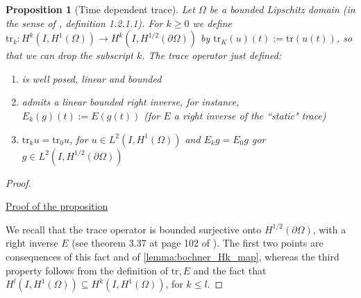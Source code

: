\documentclass[english,a4paper,9pt,oneside]{scrbook}	%
\theoremstyle{break}
\newtheorem{prop}[equation]{Proposition}
\newenvironment{mproof}[1][\proofname]{%
  \begin{proof}[#1]$ $\par\nobreak\ignorespaces
}{%
  \end{proof}
}
\renewcommand*{\proofname}{Proof}
\theoremstyle{remark}
\newcommand{\tr}{\text{tr}}
\newcommand{\emb}{\hookrightarrow}
\begin{document}
\begin{appendices}
\begin{prop}[Time dependent trace]
\label{prop:trace}
Let $\Omega$ be a bounded Lipschitz domain (in the sense of \cite{grisvard}, definition 1.2.1.1). For $k\geq 0$ we define $\tr_k: H^k(I,H^1(\Omega))\rightarrow H^k(I, H^{1/2} (\partial \Omega))$ by $\tr_K(u)(t):=\tr(u(t))$, so that we can drop the subscript $k$. The trace operator just defined:
\begin{enumerate}
\item is well posed, linear and bounded
\item admits a linear bounded right inverse, for instance, $E_k(g)(t):=E(g(t))$ (for $E$ a right inverse of the ``static" trace)
\item $\tr_k u = \tr_0 u$, for $u \in L^2(I,H^1(\Omega))$ and $E_k g = E_0g$ gor $g \in L^2(I,H^{1/2}(\partial \Omega))$
\end{enumerate}
\end{prop}
\begin{mproof}

\underline{Proof of the proposition}

We recall that the trace operator is bounded surjective onto $H^{1/2}(\partial \Omega)$, with a right inverse $E$ (see theorem 3.37 at page 102 of \cite{mclean}). The first two points are consequences of this fact and of \cref{lemma:bochner_Hk_map}, whereas the third property follows from the definition of $\tr, E$ and the fact that $H^l(I,H^1(\Omega))\subseteq H^k(I,H^1(\Omega))$, for $k\leq l$.



\end{mproof}
\end{appendices}
\end{document}
